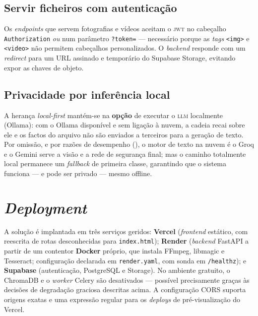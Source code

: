 \subsection{Servir ficheiros com autenticação}

Os \emph{endpoints} que servem fotografias e vídeos aceitam o \textsc{jwt}
no cabeçalho \texttt{Authorization} \emph{ou} num parâmetro
\texttt{?token=} — necessário porque as \emph{tags} \texttt{<img>} e
\texttt{<video>} não permitem cabeçalhos personalizados. O \emph{backend}
responde com um \emph{redirect} para um URL assinado e temporário do
Supabase Storage, evitando expor as chaves de objeto.

\subsection{Privacidade por inferência local}

A herança \emph{local-first} mantém-se na \textbf{opção} de executar o
\textsc{llm} localmente (Ollama): com o Ollama disponível e sem ligação à
nuvem, a cadeia recai sobre ele e os factos do arquivo não são enviados a
terceiros para a geração de texto. Por omissão, e por razões de desempenho
(), o motor de texto na nuvem é o Groq e o Gemini serve a
visão e a rede de segurança final; mas o caminho totalmente local
permanece um \emph{fallback} de primeira classe, garantindo que o sistema
funciona --- e pode ser privado --- mesmo offline.

\section{\emph{Deployment}}
\label{sec:impl_deploy}

A solução é implantada em três serviços geridos: \textbf{Vercel}
(\emph{frontend} estático, com reescrita de rotas desconhecidas para
\texttt{index.html}); \textbf{Render} (\emph{backend} FastAPI a partir de
um contentor \textbf{Docker} próprio, que instala FFmpeg, libmagic e
Tesseract; configuração declarada em \texttt{render.yaml}, com sonda em
\texttt{/healthz}); e \textbf{Supabase} (autenticação, PostgreSQL e
Storage). No ambiente gratuito, o ChromaDB e o \emph{worker} Celery são
desativados — possível precisamente graças às decisões de degradação
graciosa descritas acima. A configuração CORS suporta origens exatas e uma
expressão regular para os \emph{deploys} de pré-visualização do Vercel.
